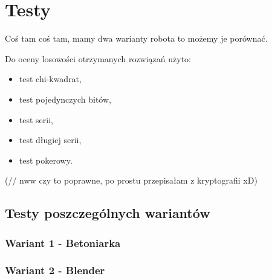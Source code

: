 \chapter{Testy}

Coś tam coś tam, mamy dwa warianty robota to możemy je porównać.

Do oceny losowości otrzymanych rozwiązań użyto:
\begin{itemize}
    \item test chi-kwadrat,
    \item test pojedynczych bitów,
    \item test serii,
    \item test długiej serii,
    \item test pokerowy.
\end{itemize}
(// nww czy to poprawne, po prostu przepisałam z kryptografii xD)

\section{Testy poszczególnych wariantów}
\subsection{Wariant 1 - \glqq Betoniarka\grqq}
\subsection{Wariant 2 - \glqq Blender\grqq}

